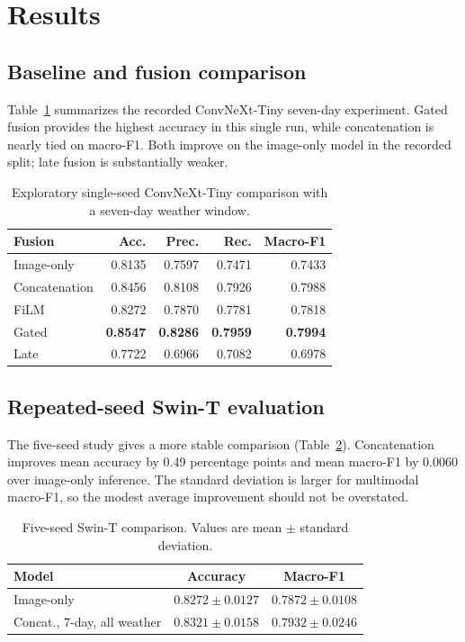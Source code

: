 \documentclass[conference]{IEEEtran}
\begin{document}
\section{Results}
\subsection{Baseline and fusion comparison}
Table~\ref{tab:single} summarizes the recorded ConvNeXt-Tiny seven-day experiment. Gated fusion provides the highest accuracy in this single run, while concatenation is nearly tied on macro-F1. Both improve on the image-only model in the recorded split; late fusion is substantially weaker.

\begin{table}[t]
\centering
\caption{Exploratory single-seed ConvNeXt-Tiny comparison with a seven-day weather window.}
\label{tab:single}
\scriptsize
\begin{tabular}{lrrrr}
\toprule
Fusion & Acc. & Prec. & Rec. & Macro-F1\\
\midrule
Image-only & 0.8135 & 0.7597 & 0.7471 & 0.7433\\
Concatenation & 0.8456 & 0.8108 & 0.7926 & 0.7988\\
FiLM & 0.8272 & 0.7870 & 0.7781 & 0.7818\\
Gated & \textbf{0.8547} & \textbf{0.8286} & \textbf{0.7959} & \textbf{0.7994}\\
Late & 0.7722 & 0.6966 & 0.7082 & 0.6978\\
\bottomrule
\end{tabular}
\end{table}

\subsection{Repeated-seed Swin-T evaluation}
The five-seed study gives a more stable comparison (Table~\ref{tab:seeds}). Concatenation improves mean accuracy by 0.49 percentage points and mean macro-F1 by 0.0060 over image-only inference. The standard deviation is larger for multimodal macro-F1, so the modest average improvement should not be overstated.

\begin{table}[t]
\centering
\caption{Five-seed Swin-T comparison. Values are mean $\pm$ standard deviation.}
\label{tab:seeds}
\scriptsize
\begin{tabular}{lcc}
\toprule
Model & Accuracy & Macro-F1\\
\midrule
Image-only & $0.8272\pm0.0127$ & $0.7872\pm0.0108$\\
Concat., 7-day, all weather & $\mathbf{0.8321\pm0.0158}$ & $\mathbf{0.7932\pm0.0246}$\\
\bottomrule
\end{tabular}
\end{table}
\end{document}
